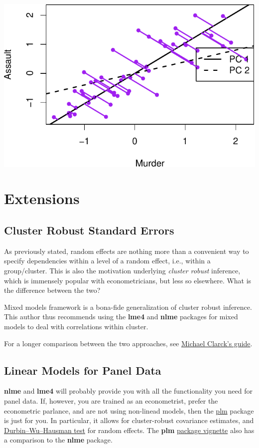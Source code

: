 \documentclass[]{book}
\theoremstyle{definition}
\theoremstyle{definition}
\theoremstyle{definition}
\theoremstyle{remark}
\begin{document}
\includegraphics[width=0.5\linewidth]{Rcourse_files/figure-latex/unnamed-chunk-200-1}

\section{Extensions}\label{extensions-1}

\subsection{Cluster Robust Standard
Errors}\label{cluster-robust-standard-errors}

As previously stated, random effects are nothing more than a convenient
way to specify dependencies within a level of a random effect, i.e.,
within a group/cluster. This is also the motivation underlying
\emph{cluster robust} inference, which is immensely popular with
econometricians, but less so elsewhere. What is the difference between
the two?

Mixed models framework is a bona-fide generalization of cluster robust
inference. This author thus recommends using the \textbf{lme4} and
\textbf{nlme} packages for mixed models to deal with correlations within
cluster.

For a longer comparison between the two approaches, see
\href{https://m-clark.github.io/docs/clustered/}{Michael Clarck's
guide}.

\subsection{Linear Models for Panel
Data}\label{linear-models-for-panel-data}

\textbf{nlme} and \textbf{lme4} will probably provide you with all the
functionality you need for panel data. If, however, you are trained as
an econometrist, prefer the econometric parlance, and are not using
non-linead models, then the
\href{https://cran.r-project.org/package=plm}{plm} package is just for
you. In particular, it allows for cluster-robust covariance estimates,
and
\href{https://en.wikipedia.org/wiki/Durbin\%E2\%80\%93Wu\%E2\%80\%93Hausman_test}{Durbin--Wu--Hausman
test} for random effects. The \textbf{plm}
\href{https://cran.r-project.org/web/packages/plm/vignettes/plm.pdf}{package
vignette} also has a comparison to the \textbf{nlme} package.
\end{document}
